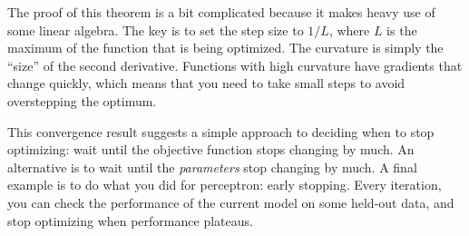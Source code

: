 
The proof of this theorem is a bit complicated because it makes heavy
use of some linear algebra.  The key is to set the step size to
$1/L$, where $L$ is the maximum  of the function
that is being optimized.  The curvature is simply the ``size'' of the
second derivative.  Functions with high curvature have gradients that
change quickly, which means that you need to take small steps to avoid
overstepping the optimum.

This convergence result suggests a simple approach to deciding when to
stop optimizing: wait until the objective function stops changing by
much.  An alternative is to wait until the \emph{parameters} stop
changing by much.  A final example is to do what you did for
perceptron: early stopping.  Every iteration, you can check the
performance of the current model on some held-out data, and stop
optimizing when performance plateaus.

